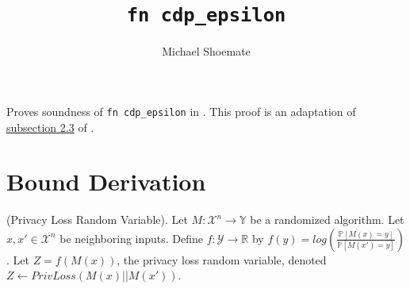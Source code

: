 \documentclass{article}
\title{\texttt{fn cdp\_epsilon}}
\author{Michael Shoemate}
\begin{document}
\maketitle

Proves soundness of \texttt{fn cdp\_epsilon} in .
This proof is an adaptation of \href{https://arxiv.org/pdf/2004.00010.pdf#subsection.2.3}{subsection 2.3} of \cite{CKS20}.
\section{Bound Derivation}

\begin{definition}
\label{plrv}
(Privacy Loss Random Variable). 
Let $M: \mathcal{X}^n \rightarrow \mathbb{Y}$ be a randomized algorithm.
Let $x, x' \in \mathcal{X}^n$ be neighboring inputs.
Define $f: \mathcal{Y} \rightarrow \mathbb{R}$ by $f(y) = log \left( \frac{\mathbb{P}[M(x)=y]}{\mathbb{P}[M(x')=y]} \right)$.
Let $Z = f(M(x))$, the privacy loss random variable, denoted $Z \leftarrow PrivLoss(M(x) || M(x'))$.
\end{definition}
\end{document}
